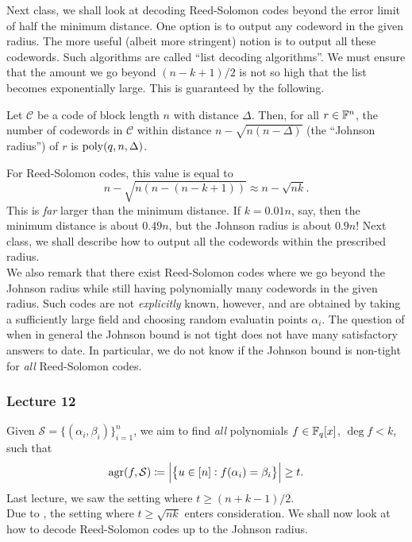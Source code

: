 			Next class, we shall look at decoding Reed-Solomon codes beyond the error limit of half the minimum distance. One option is to output any codeword in the given radius. The more useful (albeit more stringent) notion is to output all these codewords. Such algorithms are called ``list decoding algorithms''.
			We must ensure that the amount we go beyond $(n-k+1)/2$ is not so high that the list becomes exponentially large. This is guaranteed by the following.

			\begin{ftheo}[Johnson]
				\label{johnson bound}
				Let $\mathcal{C}$ be a code of block length $n$ with distance $\Delta$. Then, for all $r \in \mathbb{F}^n$, the number of codewords in $\mathcal{C}$ within distance $n - \sqrt{n(n-\Delta)}$ (the ``Johnson radius'') of $r$ is $\operatorname{poly}(q,n,\Delta)$.
			\end{ftheo}

			For Reed-Solomon codes, this value is equal to
			\[ n - \sqrt{n\left( n - (n-k+1) \right)} \approx n-\sqrt{nk}. \]
			This is \emph{far} larger than the minimum distance. If $k = 0.01n$, say, then the minimum distance is about $0.49n$, but the Johnson radius is about $0.9n$! Next class, we shall describe how to output all the codewords within the prescribed radius.\\
			We also remark that there exist Reed-Solomon codes where we go beyond the Johnson radius while still having polynomially many codewords in the given radius. Such codes are not \emph{explicitly} known, however, and are obtained by taking a sufficiently large field and choosing random evaluatin points $\alpha_i$. %
			The question of when in general the Johnson bound is not tight does not have many satisfactory answers to date. In particular, we do not know if the Johnson bound is non-tight for \emph{all} Reed-Solomon codes.

		\subsubsection{Lecture 12}

			Given $\mathcal{S} = \{(\alpha_i,\beta_i)\}_{i=1}^n$, we aim to find \emph{all} polynomials $f \in \mathbb{F}_q[x]$, $\deg f < k$, such that
			\[ \operatorname{agr}(f,\mathcal{S}) \coloneqq \left|\left\{ u \in [n] : f(\alpha_i) = \beta_i \right\}\right| \ge t. \]
			Last lecture, we saw the setting where $t \ge (n+k-1)/2$.\\
			Due to , the setting where $t \ge \sqrt{nk}$ enters consideration. We shall now look at how to decode Reed-Solomon codes up to the Johnson radius. \\ %

